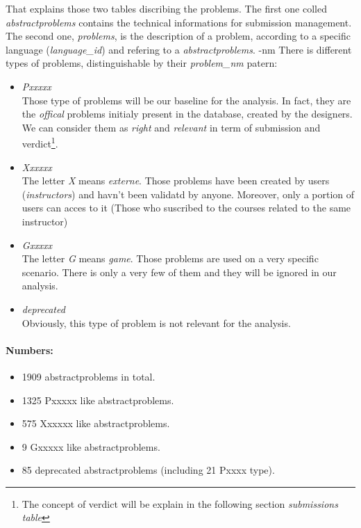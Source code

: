 That explains those two tables discribing the problems. The first one colled \emph{abstractproblems} contains the technical informations for submission management. The second one, \emph{problems}, is the description of a problem, according to a specific language (\emph{language\_id}) and refering to a \emph{abstractproblems}.
-nm
There is different types of problems, distinguishable by their \emph{problem\_nm} patern:
\begin{itemize}
	\setlength\itemsep{0em}
	\item \emph{Pxxxxx}\\
	Those type of problems will be our baseline for the analysis. In fact, they are the \emph{offical} problems initialy present in the database, created by the designers. We can consider them as \emph{right} and \emph{relevant} in term of submission and verdict\footnote{The concept of verdict will be explain in the following section \emph{submissions table}}.

	\item \emph{Xxxxxx}\\
	The letter \emph{X} means \emph{externe}. Those problems have been created by users (\emph{instructors}) and havn't been validatd by anyone. Moreover, only a portion of users can acces to it (Those who suscribed to the courses related to the same instructor)

	\item \emph{Gxxxxx}\\
	The letter \emph{G} means \emph{game}. Those problems are used on a very specific scenario. There is only a very few of them and they will be ignored in our analysis.

	\item \emph{deprecated}\\
	Obviously, this type of problem is not relevant for the analysis. 

\end{itemize}

\paragraph{Numbers:}%
\begin{itemize}
	\setlength\itemsep{0em}
	\item 1909 abstractproblems in total.
	\item 1325 Pxxxxx like abstractproblems.
	\item 575 Xxxxxx like abstractproblems.
	\item 9 Gxxxxx like abstractproblems.
	\item 85 deprecated abstractproblems (including 21 Pxxxx type). 
\end{itemize}

